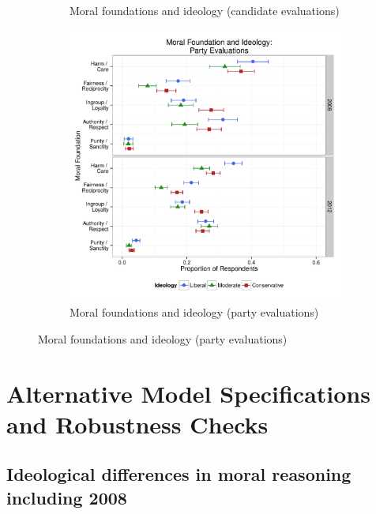 \documentclass[12pt]{article}
\begin{document}
\begin{figure}[ht]
\begin{subfigure}[t]{0.49\textwidth}
\caption{Moral foundations and ideology (candidate evaluations)}\label{fig:appC2cand}
  \end{subfigure}
  \begin{subfigure}[t]{0.49\textwidth}
    \includegraphics[scale=.35]{../calc/fig/appC3party.pdf}
\caption{Moral foundations and ideology (party evaluations)}\label{fig:appC3party}
  \end{subfigure}
\end{figure}


\clearpage
\section{Alternative Model Specifications and Robustness Checks}\label{app:robust}
\renewcommand\thefigure{\thesection.\arabic{figure}}
\renewcommand\thetable{\thesection.\arabic{table}}
\setcounter{figure}{0}
\setcounter{table}{0}


\subsection{Ideological differences in moral reasoning including 2008}
\end{document}
